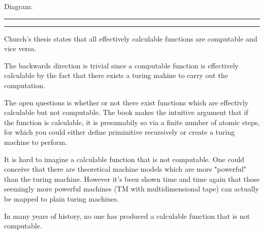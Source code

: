 \documentclass[11pt,letterpaper]{article}
\newcommand{\question}[1] {\vspace{.25in} \hrule\vspace{0.5em}
\noindent{\bf #1} \vspace{0.5em}
\hrule \vspace{.10in}}
\begin{document}
Diagram:
\begin{center}
\end{center}


\question{3}
Church's thesis states that all effectively calculable functions are computable and vice versa.

The backwards direction is trivial since a computable function is effectively calculable by the fact that there exists a turing mahine to carry out the computation.

The open questions is whether or not there exist functions which are effectivly calculable but not computable. The book makes the intuitive argument that if the function is calculable,
it is presumabily so via a finite number of atomic steps, for which you could either define priminitive recursively or create a turing machine to perform.

It is hard to imagine a calculable function that is not computable. One could conceive that there are
theoretical machine models which are more "powerful" than the turing machine. However it's been shown time and time again that those seemingly more powerful machines (TM with multidimensional tape) can actually be mapped to plain turing machines.

In many  years of history, no one has produced a calculable function that is not computable.
\end{document}
